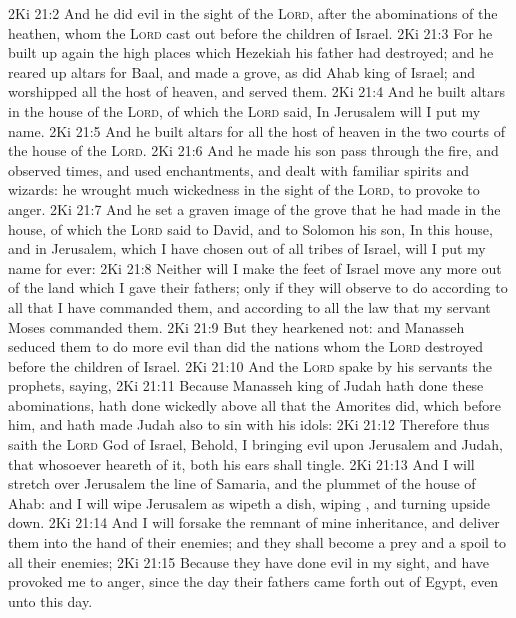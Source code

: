 \vs 2Ki 21:2 And he did  evil in the sight of the \textsc{Lord}, after the abominations of the heathen, whom the \textsc{Lord} cast out before the children of Israel.
\vs 2Ki 21:3 For he built up again the high places which Hezekiah his father had destroyed; and he reared up altars for Baal, and made a grove, as did Ahab king of Israel; and worshipped all the host of heaven, and served them.
\vs 2Ki 21:4 And he built altars in the house of the \textsc{Lord}, of which the \textsc{Lord} said, In Jerusalem will I put my name.
\vs 2Ki 21:5 And he built altars for all the host of heaven in the two courts of the house of the \textsc{Lord}.
\vs 2Ki 21:6 And he made his son pass through the fire, and observed times, and used enchantments, and dealt with familiar spirits and wizards: he wrought much wickedness in the sight of the \textsc{Lord}, to provoke  to anger.
\vs 2Ki 21:7 And he set a graven image of the grove that he had made in the house, of which the \textsc{Lord} said to David, and to Solomon his son, In this house, and in Jerusalem, which I have chosen out of all tribes of Israel, will I put my name for ever:
\vs 2Ki 21:8 Neither will I make the feet of Israel move any more out of the land which I gave their fathers; only if they will observe to do according to all that I have commanded them, and according to all the law that my servant Moses commanded them.
\vs 2Ki 21:9 But they hearkened not: and Manasseh seduced them to do more evil than did the nations whom the \textsc{Lord} destroyed before the children of Israel.
\vs 2Ki 21:10 And the \textsc{Lord} spake by his servants the prophets, saying,
\vs 2Ki 21:11 Because Manasseh king of Judah hath done these abominations,  hath done wickedly above all that the Amorites did, which  before him, and hath made Judah also to sin with his idols:
\vs 2Ki 21:12 Therefore thus saith the \textsc{Lord} God of Israel, Behold, I  bringing  evil upon Jerusalem and Judah, that whosoever heareth of it, both his ears shall tingle.
\vs 2Ki 21:13 And I will stretch over Jerusalem the line of Samaria, and the plummet of the house of Ahab: and I will wipe Jerusalem as  wipeth a dish, wiping , and turning  upside down.
\vs 2Ki 21:14 And I will forsake the remnant of mine inheritance, and deliver them into the hand of their enemies; and they shall become a prey and a spoil to all their enemies;
\vs 2Ki 21:15 Because they have done  evil in my sight, and have provoked me to anger, since the day their fathers came forth out of Egypt, even unto this day.
